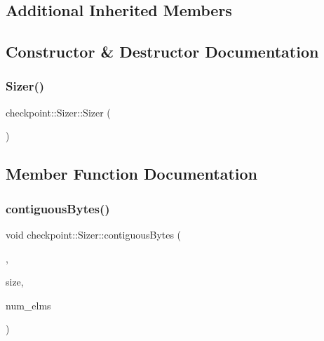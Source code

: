 \subsection*{Additional Inherited Members}


\subsection{Constructor \& Destructor Documentation}
\mbox{\label{structcheckpoint_1_1_sizer_a17995329af9eec00859e86c6fabf4890}} 
\subsubsection{\texorpdfstring{Sizer()}{Sizer()}}
{\footnotesize\ttfamily checkpoint\+::\+Sizer\+::\+Sizer (\begin{DoxyParamCaption}{ }\end{DoxyParamCaption})}



\subsection{Member Function Documentation}
\mbox{\label{structcheckpoint_1_1_sizer_a815b43e2422239df38ad4e324f1ffec0}} 
\subsubsection{\texorpdfstring{contiguous\+Bytes()}{contiguousBytes()}}
{\footnotesize\ttfamily void checkpoint\+::\+Sizer\+::contiguous\+Bytes (\begin{DoxyParamCaption}\item[{void $\ast$}]{,  }\item[{\hyperlink{namespacecheckpoint_a083f6674da3f94c2901b18c6d238217c}{Serial\+Size\+Type}}]{size,  }\item[{\hyperlink{namespacecheckpoint_a083f6674da3f94c2901b18c6d238217c}{Serial\+Size\+Type}}]{num\+\_\+elms }\end{DoxyParamCaption})}

\mbox{\label{structcheckpoint_1_1_sizer_a9cabfd6cafb49a79b645663c41e4c74a}} 
